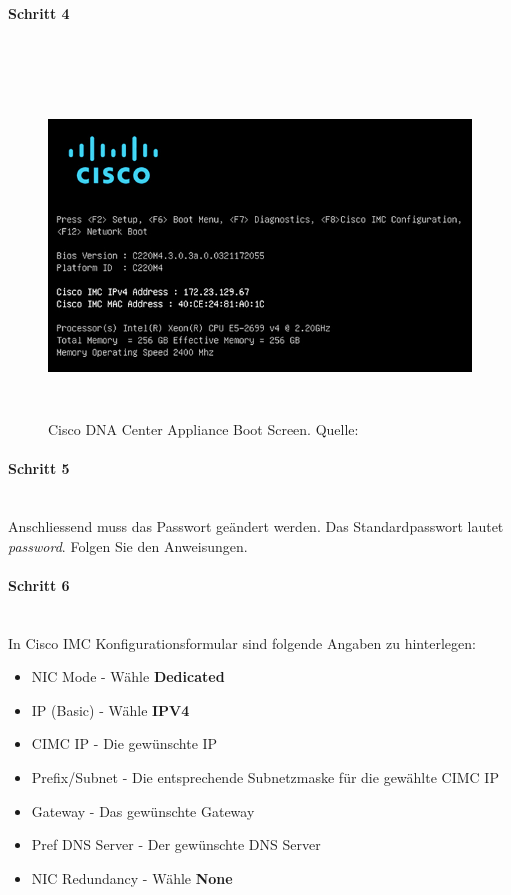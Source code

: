 \paragraph{Schritt 4}
~\\
\begin{figure}[H]
	\centering
	\includegraphics[height=9cm]{img/installguide/pic_1.jpg}
	\caption{Cisco DNA Center Appliance Boot Screen. Quelle: \cite{cisco-dna-installation-guide-1-2-chapter-install}}
	\label{fig:installguide-dna-center-install-step-1}
\end{figure} 

\paragraph{Schritt 5}
~\\
Anschliessend muss das Passwort geändert werden. Das Standardpasswort lautet \textit{password}. Folgen Sie den Anweisungen.

\paragraph{Schritt 6}
~\\
In Cisco IMC Konfigurationsformular sind folgende Angaben zu hinterlegen:
\begin{itemize}
	\item NIC Mode - Wähle \textbf{Dedicated}
	\item IP (Basic) - Wähle \textbf{IPV4}
	\item CIMC IP - Die gewünschte IP 
	\item Prefix/Subnet - Die entsprechende Subnetzmaske für die gewählte CIMC IP
	\item Gateway - Das gewünschte Gateway
	\item Pref DNS Server - Der gewünschte DNS Server
	\item NIC Redundancy - Wähle \textbf{None}
\end{itemize}


